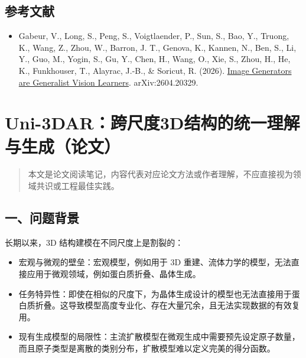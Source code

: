 \hypertarget{ux53c2ux8003ux6587ux732e-198}{%
\subsection{参考文献}\label{ux53c2ux8003ux6587ux732e-198}}

\begin{itemize}
\tightlist
\item
  Gabeur, V., Long, S., Peng, S., Voigtlaender, P., Sun, S., Bao, Y., Truong, K., Wang, Z., Zhou, W., Barron, J. T., Genova, K., Kannen, N., Ben, S., Li, Y., Guo, M., Yogin, S., Gu, Y., Chen, H., Wang, O., Xie, S., Zhou, H., He, K., Funkhouser, T., Alayrac, J.-B., \& Soricut, R. (2026). \href{https://arxiv.org/abs/2604.20329}{Image Generators are Generalist Vision Learners}. arXiv:2604.20329.
\end{itemize}

\clearpage

\hypertarget{uni-3darux8de8ux5c3aux5ea63dux7ed3ux6784ux7684ux7edfux4e00ux7406ux89e3ux4e0eux751fux6210ux8bbaux6587}{%
\section{Uni-3DAR：跨尺度3D结构的统一理解与生成（论文）}\label{uni-3darux8de8ux5c3aux5ea63dux7ed3ux6784ux7684ux7edfux4e00ux7406ux89e3ux4e0eux751fux6210ux8bbaux6587}}

\begin{quote}
本文是论文阅读笔记，内容代表对应论文方法或作者理解，不应直接视为领域共识或工程最佳实践。
\end{quote}

\hypertarget{ux4e00ux95eeux9898ux80ccux666f-15}{%
\subsection{一、问题背景}\label{ux4e00ux95eeux9898ux80ccux666f-15}}

长期以来，3D 结构建模在不同尺度上是割裂的：

\begin{itemize}
\tightlist
\item
  宏观与微观的壁垒：宏观模型，例如用于 3D 重建、流体力学的模型，无法直接应用于微观领域，例如蛋白质折叠、晶体生成。
\item
  任务特异性：即使在相似的尺度下，为晶体生成设计的模型也无法直接用于蛋白质折叠。这导致模型高度专业化、存在大量冗余，且无法实现数据的有效复用。
\item
  现有生成模型的局限性：主流扩散模型在微观生成中需要预先设定原子数量，而且原子类型是离散的类别分布，扩散模型难以定义完美的得分函数。
\end{itemize}

